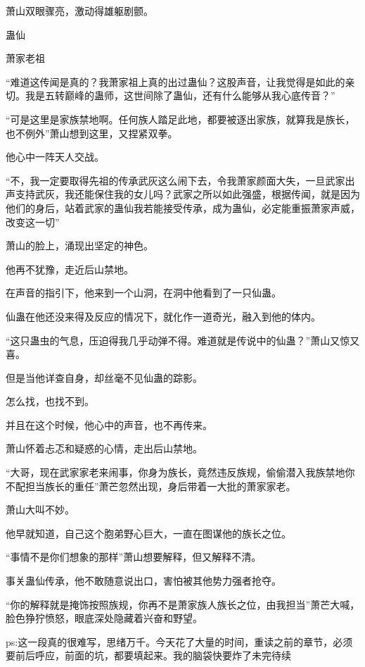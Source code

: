 \begin{this_body}
萧山双眼骤亮，激动得雄躯剧颤。

蛊仙

萧家老祖

“难道这传闻是真的？我萧家祖上真的出过蛊仙？这股声音，让我觉得是如此的亲切。我是五转巅峰的蛊师，这世间除了蛊仙，还有什么能够从我心底传音？”

“可是这里是家族禁地啊。任何族人踏足此地，都要被逐出家族，就算我是族长，也不例外”萧山想到这里，又捏紧双拳。

他心中一阵天人交战。

“不，我一定要取得先祖的传承武灰这么闹下去，令我萧家颜面大失，一旦武家出声支持武灰，我还能保住我的女儿吗？武家之所以如此强盛，根据传闻，就是因为他们的身后，站着武家的蛊仙我若能接受传承，成为蛊仙，必定能重振萧家声威，改变这一切”

萧山的脸上，涌现出坚定的神色。

他再不犹豫，走近后山禁地。

在声音的指引下，他来到一个山洞，在洞中他看到了一只仙蛊。

仙蛊在他还没来得及反应的情况下，就化作一道奇光，融入到他的体内。

“这只蛊虫的气息，压迫得我几乎动弹不得。难道就是传说中的仙蛊？”萧山又惊又喜。

但是当他详查自身，却丝毫不见仙蛊的踪影。

怎么找，也找不到。

并且在这个时候，他心中的声音，也不再传来。

萧山怀着忐忑和疑惑的心情，走出后山禁地。

“大哥，现在武家家老来闹事，你身为族长，竟然违反族规，偷偷潜入我族禁地你不配担当族长的重任”萧芒忽然出现，身后带着一大批的萧家家老。

萧山大叫不妙。

他早就知道，自己这个胞弟野心巨大，一直在图谋他的族长之位。

“事情不是你们想象的那样”萧山想要解释，但又解释不清。

事关蛊仙传承，他不敢随意说出口，害怕被其他势力强者抢夺。

“你的解释就是掩饰按照族规，你再不是萧家族人族长之位，由我担当”萧芒大喊，脸色狰狞愤怒，眼底深处隐藏着兴奋和野望。

ps:这一段真的很难写，思绪万千。今天花了大量的时间，重读之前的章节，必须要前后呼应，前面的坑，都要填起来。我的脑袋快要炸了未完待续

\end{this_body}

